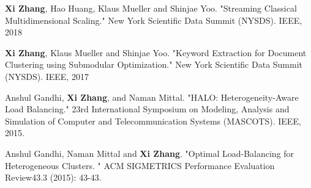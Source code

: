 


\begin{cvpapers}


\item \cvpaper
{\textbf{Xi Zhang}, Hao Huang, Klaus Mueller and Shinjae Yoo. "Streaming Classical Multidimensional Scaling." New York Scientific Data Summit (NYSDS). IEEE, 2018} 


\item \cvpaper
{\textbf{Xi Zhang}, Klaus Mueller and Shinjae Yoo. "Keyword Extraction for Document Clustering using Submodular Optimization." New York Scientific Data Summit (NYSDS). IEEE, 2017} 


\item \cvpaper
{Anshul Gandhi, \textbf{Xi Zhang}, and Naman Mittal. "HALO: Heterogeneity-Aware Load Balancing." 23rd International Symposium on Modeling, Analysis and Simulation of Computer and Telecommunication Systems (MASCOTS). IEEE, 2015.} 


\item \cvpaper
{Anshul Gandhi, Naman Mittal and \textbf{Xi Zhang}. "Optimal Load-Balancing for Heterogeneous Clusters. " ACM SIGMETRICS Performance Evaluation Review43.3 (2015): 43-43.
}

\end{cvpapers}